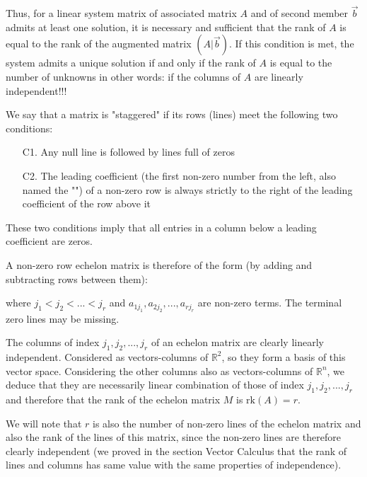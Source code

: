 	Thus, for a linear system matrix of associated matrix $A$ and of second member $\vec{b}$ admits at least one solution, it is necessary and sufficient that the rank of $A$ is equal to the rank of the augmented matrix $(A|\vec{b})$. If this condition is met, the system admits a unique solution if and only if the rank of $A$ is equal to the number of unknowns in other words: if the columns of $A$ are linearly independent!!!
	
	We say that a matrix is "staggered" if its rows (lines) meet the following two conditions:
	\begin{enumerate}
		\item[C1.] Any null line is followed by lines full of zeros
		
		\item[C2.] The leading coefficient (the first non-zero number from the left, also named the "") of a non-zero row is always strictly to the right of the leading coefficient of the row above it 
	\end{enumerate}
	These two conditions imply that all entries in a column below a leading coefficient are zeros.
	
	A non-zero row echelon matrix is therefore of the form (by adding and subtracting rows between them):
	
	where $j_1<j_2<...<j_r$ and $a_{1j_1},a_{2j_2},...,a_{rj_r}$ are non-zero terms. The terminal zero lines may be missing.
	
	The columns of index $j_1,j_2,...,j_r$ of an echelon matrix are clearly linearly independent. Considered as vectors-columns of $\mathbb{R}^2$, so they form a basis of this vector space. Considering the other columns also as vectors-columns of $\mathbb{R}^n$, we deduce that they are necessarily linear combination of those of index  $j_1,j_2,...,j_r$ and therefore that the rank of the echelon matrix $M$ is $\text{rk}(A)=r$.
	
	We will note that $r$ is also the number of non-zero lines of the echelon matrix and also the rank of the lines of this matrix, since the non-zero lines are therefore clearly independent (we proved in the section Vector Calculus that the rank of lines and columns has same value with the same properties of independence).
	
